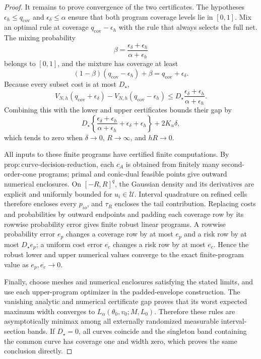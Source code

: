 \documentclass{article}
\begin{document}
\begin{proof}
It remains to prove convergence of the two certificates.  The hypotheses
\(\epsilon_h\le q_{\mathrm{cov}}\) and \(\epsilon_\delta\le\alpha\) ensure that both program coverage levels lie in \([0,1]\).  Mix an optimal rule at coverage \(q_{\mathrm{cov}}-\epsilon_h\) with the rule that always selects the full net.  The mixing probability
\[
\beta=
\frac{\epsilon_\delta+\epsilon_h}{\alpha+\epsilon_h}
\]
belongs to \([0,1]\), and the mixture has coverage at least
\[
(1-\beta)(q_{\mathrm{cov}}-\epsilon_h)+\beta
=q_{\mathrm{cov}}+\epsilon_\delta.
\]
Because every subset cost is at most \(D_\star\),
\[
V_{N,h}(q_{\mathrm{cov}}+\epsilon_\delta)
-V_{N,h}(q_{\mathrm{cov}}-\epsilon_h)
\le
D_\star\frac{\epsilon_\delta+\epsilon_h}{\alpha+\epsilon_h}.
\]
Combining this with the lower and upper certificates bounds their gap by
\[
D_\star\left\{
\frac{\epsilon_\delta+\epsilon_h}{\alpha+\epsilon_h}
+\epsilon_\delta+\epsilon_h
\right\}
+2K_u\delta,
\]
which tends to zero when \(\delta\to0\), \(R\to\infty\), and \(hR\to0\).

All inputs to these finite programs have certified finite computations.  By
\(\mathrm{prop:curve\mbox{-}decision\mbox{-}reduction}\), each \(c_A\) is obtained from finitely many second-order-cone programs; primal and conic-dual feasible points give outward numerical enclosures.  On \([-R,R]^q\), the Gaussian density and its derivatives are explicit and uniformly bounded for \(u_i\in\mathcal U\).  Interval quadrature on refined cells therefore encloses every \(p_{io}\), and \(\tau_R\) encloses the tail contribution.  Replacing costs and probabilities by outward endpoints and padding each coverage row by its rowwise probability error gives finite robust linear programs.  A rowwise probability error \(e_p\) changes a coverage row by at most \(e_p\) and a risk row by at most \(D_\star e_p\); a uniform cost error \(e_c\) changes a risk row by at most \(e_c\).  Hence the robust lower and upper numerical values converge to the exact finite-program value as \(e_p,e_c\to0\).

Finally, choose meshes and numerical enclosures satisfying the stated limits, and use each upper-program optimizer in the padded-envelope construction.  The vanishing analytic and numerical certificate gap proves that its worst expected maximum width converges to
\(L_\alpha(\theta_0,v_0;M,L_0)\).  Therefore these rules are asymptotically minimax among all externally randomized measurable interval-section bands.  If \(D_\star=0\), all curves coincide and the singleton band containing the common curve has coverage one and width zero, which proves the same conclusion directly.
\end{proof}
\end{document}

